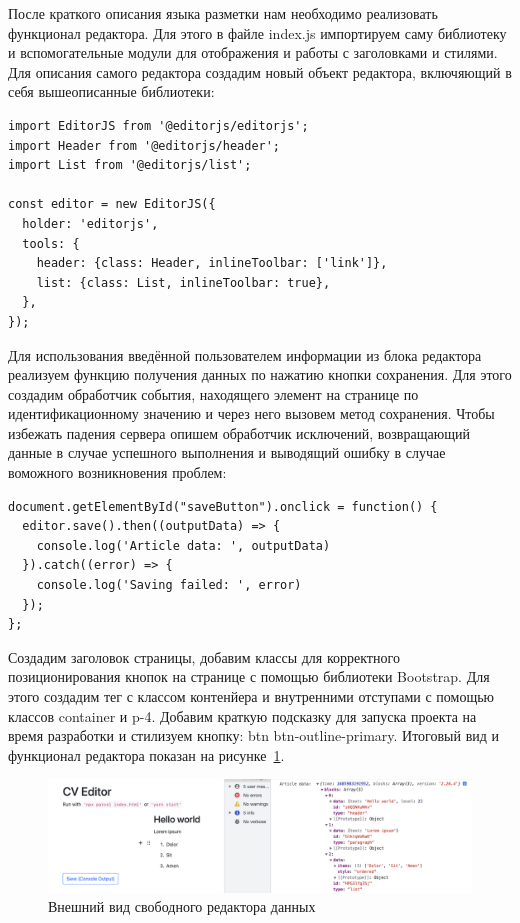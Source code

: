 \documentclass[master, och, diploma]{SCWorks}
\begin{document}
После краткого описания языка разметки нам необходимо реализовать функционал редактора. Для этого в файле index.js импортируем саму библиотеку и вспомогательные модули для отображения и работы с заголовками и стилями. Для описания самого редактора создадим новый объект редактора, включяющий в себя вышеописанные библиотеки:
\begin{verbatim}
import EditorJS from '@editorjs/editorjs'; 
import Header from '@editorjs/header'; 
import List from '@editorjs/list'; 

const editor = new EditorJS({ 
  holder: 'editorjs', 
  tools: { 
    header: {class: Header, inlineToolbar: ['link']}, 
    list: {class: List, inlineToolbar: true},
  }, 
});
\end{verbatim}

Для использования введённой пользователем информации из блока редактора реализуем функцию получения данных по нажатию кнопки сохранения. Для этого создадим обработчик события, находящего элемент на странице по идентификационному значению и через него вызовем метод сохранения. Чтобы избежать падения сервера опишем обработчик исключений, возвращающий данные в случае успешного выполнения и выводящий ошибку в случае воможного возникновения проблем:
\begin{verbatim}
document.getElementById("saveButton").onclick = function() {
  editor.save().then((outputData) => {
    console.log('Article data: ', outputData)
  }).catch((error) => {
    console.log('Saving failed: ', error)
  });
};   
\end{verbatim}

Создадим заголовок страницы, добавим классы для корректного позиционирования кнопок на странице с помощью библиотеки Bootstrap. Для этого создадим тег с классом контенйера и внутренними отступами с помощью классов container и p-4. Добавим краткую подсказку для запуска проекта на время разработки и стилизуем кнопку: btn btn-outline-primary. Итоговый вид и функционал редактора показан на рисунке~\ref{fig:21}.
\begin{figure}[!ht]
    \centering
    \includegraphics[width=12cm]{images/image22.png}
    \caption{\label{fig:21}%
        Внешний вид свободного редактора данных}
\end{figure}
\end{document}
